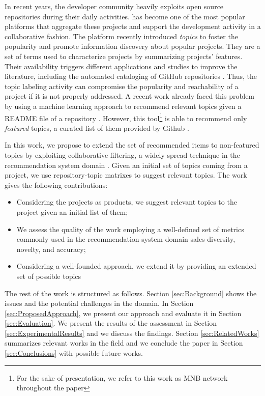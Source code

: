 In recent years, the developer community heavily exploits open source repositories during their daily activities. \GH has become one of the most
popular platforms that aggregate these projects and
support the development activity in a collaborative fashion.
%
The platform recently introduced \emph{topics} to foster the popularity and promote information discovery about popular projects. They are a set of terms used to characterize projects by summarizing projects' features. Their availability triggers different applications and studies to improve the literature, including the automated cataloging of GitHub repositories \cite{davidlo1}. 
Thus, the topic labeling activity can compromise the popularity and reachability of a project if it is not properly addressed. A recent work already faced this problem by using a machine learning approach to recommend relevant topics given a README file of a repository  \cite{MNB}. However, this tool\footnote{For the sake of presentation, we refer to this work as MNB network throughout the paper} is able to recommend only \emph{featured} topics, a curated list of them provided by Github \cite{}.

In this work, we propose to extend the set of recommended items to non-featured topics by exploiting collaborative filtering, a widely spread technique in the recommendation system domain \cite{Schafer:2007:CFR:1768197.1768208}. Given an initial set of topics coming from a \GH project, we use repository-topic matrixes to suggest relevant topics.
The work gives the following contributions:
\begin{itemize}
\item Considering the \GH projects as products, we suggest relevant topics to the project given an initial list of them;
\item We assess the quality of the work employing a well-defined set of metrics commonly used in the recommendation system domain \ie sales diversity, novelty, and accuracy;
\item Considering a well-founded approach, we extend it by providing an extended set of possible topics  
\end{itemize}

The rest of the work is structured as follows. Section \ref{sec:Background} shows the issues and the potential challenges in the domain. In Section \ref{sec:ProposedApproach}, we present our approach and evaluate it in Section \ref{sec:Evaluation}. We present the results of the assessment in Section \ref{sec:ExperimentalResults} and we discuss the findings. Section \ref{sec:RelatedWorks} summarizes relevant works in the field and we conclude the paper in Section \ref{sec:Conclusions} with possible future works.
